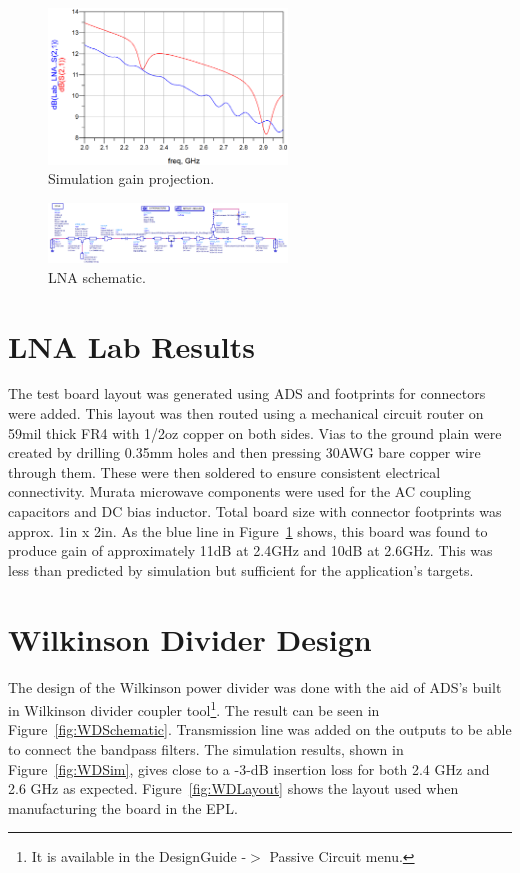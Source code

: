 \documentclass[conference]{IEEEtran}
\begin{document}
\begin{figure}[!h]
\centering
\includegraphics[width=2.5in]{amplifier_simulation_pics/lnaS21.PNG}
\caption{Simulation gain projection.}
\label{fig:LNA_sim_gain}
\end{figure}

\begin{figure}[!h]
\centering
\includegraphics[width=2.5in]{amplifier_simulation_pics/lnaSchematic.PNG}
\caption{LNA schematic.}
\label{fig:lna_schematic}
\end{figure}

\section{LNA Lab Results}
The test board layout was generated using ADS and footprints for connectors were added. This layout was then routed using a mechanical circuit router on 59mil thick FR4 with 1/2oz copper on both sides. Vias to the ground plain were created by drilling 0.35mm holes and then pressing 30AWG bare copper wire through them. These were then soldered to ensure consistent electrical connectivity. Murata microwave components were used for the AC coupling capacitors and DC bias inductor. Total board size with connector footprints was approx. 1in x 2in. As the blue line in Figure~\ref{fig:LNA_sim_gain} shows, this board was found to produce gain of approximately 11dB at 2.4GHz and 10dB at 2.6GHz. This was less than predicted by simulation but sufficient for the application's targets.


\section{Wilkinson Divider Design}
The design of the Wilkinson power divider was done with the aid of ADS's built in Wilkinson divider coupler tool\footnote{It is available in the DesignGuide -$>$ Passive Circuit menu.}. The result can be seen in Figure~\ref{fig:WDSchematic}. Transmission line was added on the outputs to be able to connect the bandpass filters. The simulation results, shown in Figure~\ref{fig:WDSim}, gives close to a -3-dB insertion loss for both 2.4 GHz and 2.6 GHz as expected. Figure~\ref{fig:WDLayout} shows the layout used when manufacturing the board in the EPL.
\end{document}
